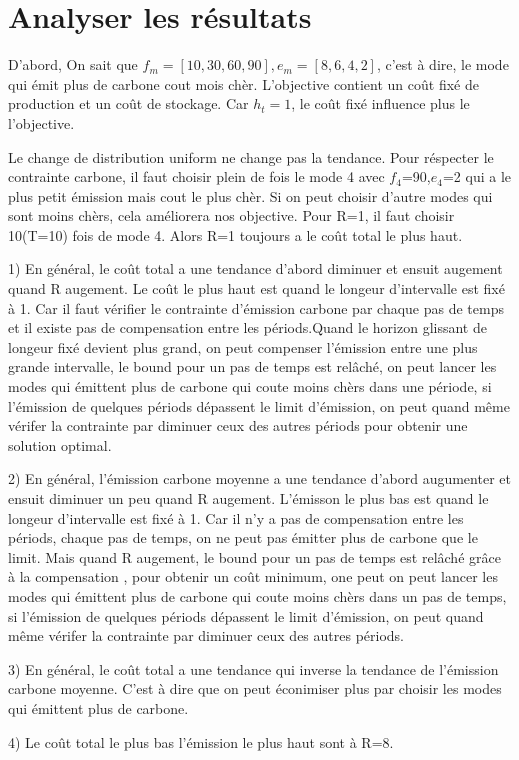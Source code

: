 \documentclass[12pt,a4paper]{article}
\begin{document}
\section{Analyser les résultats}
\begin{justify}
D'abord, On sait que $f_m=[10,30,60,90],e_m=[8,6,4,2]$, c'est à dire, le mode qui émit plus de carbone cout mois chèr. L'objective contient un coût fixé de production et un coût de stockage. Car $h_t=1$, le coût fixé influence plus le l'objective.
\end{justify}
\begin{justify}
Le change de distribution uniform ne change pas la tendance. Pour réspecter le contrainte carbone, il faut choisir plein de fois le mode 4 avec $f_4$=90,$e_4$=2 qui a le plus petit émission mais cout le plus chèr. Si on peut choisir d'autre modes qui sont moins chèrs, cela améliorera nos objective. Pour R=1, il faut choisir 10(T=10) fois de mode 4. Alors R=1 toujours a le coût total le plus haut.
\end{justify}
\begin{justify}
1) En général, le coût total a une tendance d'abord diminuer et ensuit augement quand R augement. Le coût le plus haut est quand le longeur d'intervalle est fixé à 1. Car il faut vérifier le contrainte d'émission carbone par chaque pas de temps et il existe pas de compensation entre les périods.Quand le horizon glissant de longeur fixé devient plus grand, on peut compenser l'émission entre une plus grande intervalle, le bound pour un pas de temps  est relâché, on peut lancer les modes qui émittent plus de carbone qui coute moins chèrs dans une période, si l'émission de quelques périods dépassent le limit d'émission, on peut quand même vérifer la contrainte par diminuer ceux des autres périods pour obtenir une solution optimal.
\end{justify}
\begin{justify}
2) En général, l'émission carbone moyenne a une tendance d'abord augumenter et ensuit diminuer un peu quand R augement. L'émisson le plus bas est quand le longeur d'intervalle est fixé à 1. Car il n'y a pas de compensation entre les périods, chaque pas de temps, on ne peut pas émitter plus de carbone que le limit. Mais quand R augement, le bound pour un pas de temps est relâché grâce à la compensation , pour obtenir un coût minimum, one peut  on peut lancer les modes qui émittent plus de carbone qui coute moins chèrs dans un pas de temps, si l'émission de quelques périods dépassent le limit d'émission, on peut quand même vérifer la contrainte par diminuer ceux des autres périods. 
\end{justify}
\begin{justify}
3) En général, le coût total a une tendance qui inverse la tendance de l'émission carbone moyenne. C'est à dire que on peut éconimiser plus par choisir les modes qui émittent plus de carbone.
\end{justify}
\begin{justify}
4) Le coût total le plus bas l'émission le plus haut sont à R=8.
\end{justify}
\newpage
\end{document}
